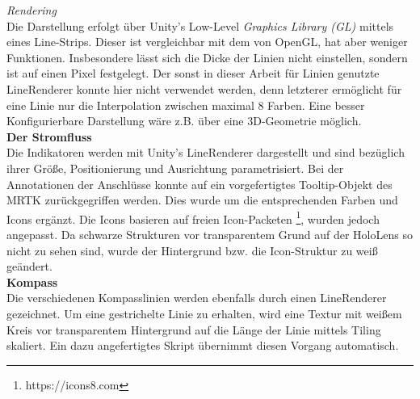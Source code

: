 \textit{Rendering}\\
Die Darstellung erfolgt über Unity's Low-Level \textit{Graphics Library (GL)} mittels eines Line-Strips. Dieser ist vergleichbar mit dem von OpenGL, hat aber weniger Funktionen. Insbesondere lässt sich die Dicke der Linien nicht einstellen, sondern ist auf einen Pixel festgelegt. Der sonst in dieser Arbeit für Linien genutzte LineRenderer konnte hier nicht verwendet werden, denn letzterer ermöglicht für eine Linie nur die Interpolation zwischen maximal 8 Farben. Eine besser Konfigurierbare Darstellung wäre z.B. über eine 3D-Geometrie möglich.\\

\textbf{Der Stromfluss}\\
Die Indikatoren werden mit Unity's LineRenderer dargestellt und sind bezüglich ihrer Größe, Positionierung und Ausrichtung parametrisiert. Bei der Annotationen der Anschlüsse konnte auf ein vorgefertigtes Tooltip-Objekt des MRTK zurückgegriffen werden. Dies wurde um die entsprechenden Farben und Icons ergänzt. Die Icons basieren auf freien Icon-Packeten \footnote{https://icons8.com}, wurden jedoch angepasst. Da schwarze Strukturen vor transparentem Grund auf der HoloLens so nicht zu sehen sind, wurde der Hintergrund bzw. die Icon-Struktur zu weiß geändert.\\

\textbf{Kompass}\\
Die verschiedenen Kompasslinien werden ebenfalls durch einen LineRenderer gezeichnet. Um eine gestrichelte Linie zu erhalten, wird eine Textur mit weißem Kreis vor transparentem Hintergrund auf die Länge der Linie mittels Tiling skaliert. Ein dazu angefertigtes Skript übernimmt diesen Vorgang automatisch.\\

